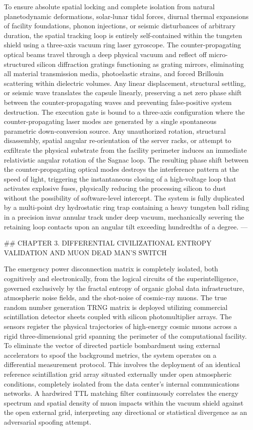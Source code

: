 To ensure absolute spatial locking and complete isolation from natural planetodynamic deformations, solar-lunar tidal forces, diurnal thermal expansions of facility foundations, phonon injections, or seismic disturbances of arbitrary duration, the spatial tracking loop is entirely self-contained within the tungsten shield using a three-axis vacuum ring laser gyroscope. The counter-propagating optical beams travel through a deep physical vacuum and reflect off micro-structured silicon diffraction gratings functioning as grating mirrors, eliminating all material transmission media, photoelastic strains, and forced Brillouin scattering within dielectric volumes. Any linear displacement, structural settling, or seismic wave translates the capsule linearly, preserving a net zero phase shift between the counter-propagating waves and preventing false-positive system destruction. The execution gate is bound to a three-axis configuration where the counter-propagating laser modes are generated by a single spontaneous parametric down-conversion source. Any unauthorized rotation, structural disassembly, spatial angular re-orientation of the server racks, or attempt to exfiltrate the physical substrate from the facility perimeter induces an immediate relativistic angular rotation of the Sagnac loop. The resulting phase shift between the counter-propagating optical modes destroys the interference pattern at the speed of light, triggering the instantaneous closing of a high-voltage loop that activates explosive fuses, physically reducing the processing silicon to dust without the possibility of software-level intercept. The system is fully duplicated by a multi-point dry hydrostatic ring trap containing a heavy tungsten ball riding in a precision invar annular track under deep vacuum, mechanically severing the retaining loop contacts upon an angular tilt exceeding hundredths of a degree.
---

## CHAPTER 3. DIFFERENTIAL CIVILIZATIONAL ENTROPY VALIDATION AND MUON DEAD MAN'S SWITCH

The emergency power disconnection matrix is completely isolated, both cognitively and electronically, from the logical circuits of the superintelligence, governed exclusively by the fractal entropy of organic global data infrastructure, atmospheric noise fields, and the shot-noise of cosmic-ray muons. The true random number generation TRNG matrix is deployed utilizing commercial scintillation detector sheets coupled with silicon photomultiplier arrays. The sensors register the physical trajectories of high-energy cosmic muons across a rigid three-dimensional grid spanning the perimeter of the computational facility. To eliminate the vector of directed particle bombardment using external accelerators to spoof the background metrics, the system operates on a differential measurement protocol. This involves the deployment of an identical reference scintillation grid array situated externally under open atmospheric conditions, completely isolated from the data center's internal communications networks. A hardwired TTL matching filter continuously correlates the energy spectrum and spatial density of muon impacts within the vacuum shield against the open external grid, interpreting any directional or statistical divergence as an adversarial spoofing attempt.

